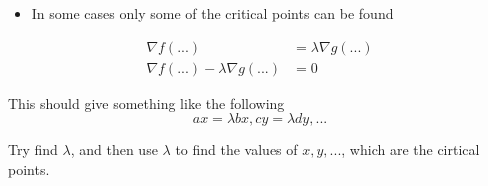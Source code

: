     \begin{itemize}
      \item In some cases only some of the critical points can be found
    \end{itemize}

    \begin{align}
      \nabla f\left( ... \right) &= \lambda \nabla g\left( ... \right) \\
      \nabla f\left( ... \right) - \lambda \nabla g\left( ... \right) &= 0
    \end{align}

    This should give something like the following
    \begin{displaymath}
      ax = \lambda bx, cy = \lambda dy, ...
    \end{displaymath}

    Try find $ \lambda $, and then use $ \lambda $ to find the values
    of $ x, y, ... $, which are the cirtical points.